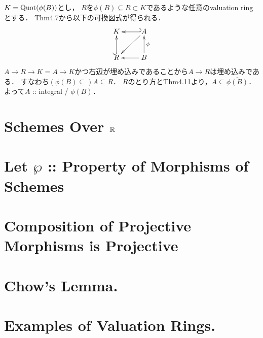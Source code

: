 \documentclass[a4paper]{jsarticle}
\begin{document}
    $K=\operatorname{Quot}(\phi(B))$とし，
    $R$を$\phi(B) \subseteq R \subset K$であるような任意のvaluation ringとする．
    Thm4.7から以下の可換図式が得られる．
    \[
    \xymatrix
    {
        K  & A \ar@{_{(}->}[l] \ar[ld]\\
        R  \ar@{^{(}->}[u]& B \ar[u]_-{\phi} \ar[l]
    }
    \]
    $A \to R \to K=A \to K$かつ右辺が埋め込みであることから$A \to R$は埋め込みである．
    すなわち$(\phi(B) \subseteq )A \subseteq R$．
    $R$のとり方とThm4.11より，$A \subseteq \overline{\phi(B)}$．
    よって$A$ :: integral / $\phi(B)$．

\section{Schemes Over $\mathbb{R}$} %

\section{Let $\wp$ :: Property of Morphisms of Schemes} %

\section{Composition of Projective Morphisms is Projective} %

\section{Chow's Lemma.} %

\section{ } %

\section{Examples of Valuation Rings.} %
\end{document}
